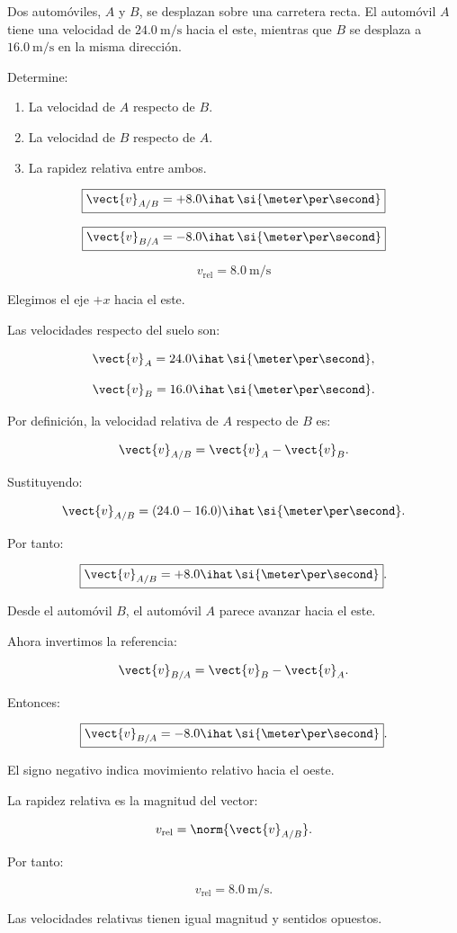 ﻿\nivelbasico

\begin{ejercicio}
Dos automóviles, \(A\) y \(B\), se desplazan sobre una carretera
recta. El automóvil \(A\) tiene una velocidad de
\(\SI{24.0}{\meter\per\second}\) hacia el este, mientras que
\(B\) se desplaza a \(\SI{16.0}{\meter\per\second}\) en
la misma dirección.

Determine:

\begin{enumerate}[label=\alph*)]
    \item La velocidad de \(A\) respecto de \(B\).
    \item La velocidad de \(B\) respecto de \(A\).
    \item La rapidez relativa entre ambos.
\end{enumerate}
\end{ejercicio}

\begin{respuesta}
\[
\boxed{
\vect{v}_{A/B}
=
+8.0\ihat\,
\si{\meter\per\second}
}
\]

\[
\boxed{
\vect{v}_{B/A}
=
-8.0\ihat\,
\si{\meter\per\second}
}
\]

\[
\boxed{
v_{\mathrm{rel}}
=
\SI{8.0}{\meter\per\second}
}
\]
\end{respuesta}

\begin{explicacion}
Elegimos el eje \(+x\) hacia el este.

Las velocidades respecto del suelo son:

\[
\vect{v}_A
=
24.0\ihat\,
\si{\meter\per\second},
\]

\[
\vect{v}_B
=
16.0\ihat\,
\si{\meter\per\second}.
\]

Por definición, la velocidad relativa de \(A\) respecto
de \(B\) es:

\[
\vect{v}_{A/B}
=
\vect{v}_A-\vect{v}_B.
\]

Sustituyendo:

\[
\vect{v}_{A/B}
=
(24.0-16.0)\ihat\,
\si{\meter\per\second}.
\]

Por tanto:

\[
\boxed{
\vect{v}_{A/B}
=
+8.0\ihat\,
\si{\meter\per\second}
}.
\]

Desde el automóvil \(B\), el automóvil \(A\)
parece avanzar hacia el este.

Ahora invertimos la referencia:

\[
\vect{v}_{B/A}
=
\vect{v}_B-\vect{v}_A.
\]

Entonces:

\[
\boxed{
\vect{v}_{B/A}
=
-8.0\ihat\,
\si{\meter\per\second}
}.
\]

El signo negativo indica movimiento relativo hacia el oeste.

La rapidez relativa es la magnitud del vector:

\[
v_{\mathrm{rel}}
=
\norm{\vect{v}_{A/B}}.
\]

Por tanto:

\[
\boxed{
v_{\mathrm{rel}}
=
\SI{8.0}{\meter\per\second}
}.
\]

Las velocidades relativas tienen igual magnitud
y sentidos opuestos.
\end{explicacion}


